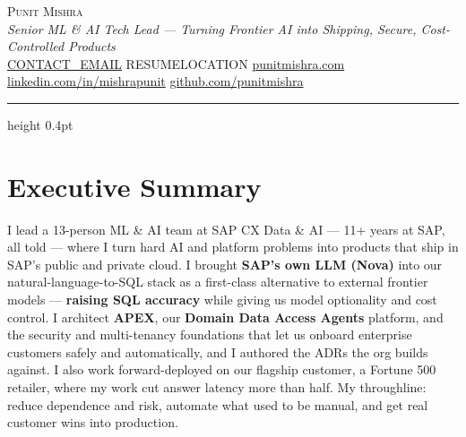 \documentclass[10pt,letterpaper]{article}
\begin{document}
\begin{center}
  {\huge\scshape Punit Mishra}\\[4pt]
  {\itshape Senior ML \& AI Tech Lead --- Turning Frontier AI into Shipping, Secure, Cost-Controlled Products}\\[6pt]
  {\small
    \href{mailto:CONTACT_EMAIL}{CONTACT\_EMAIL} \;\textbar\;
    RESUMELOCATION \;\textbar\;
    \href{https://punitmishra.com}{punitmishra.com} \;\textbar\;
    \href{https://linkedin.com/in/mishrapunit}{linkedin.com/in/mishrapunit} \;\textbar\;
    \href{https://github.com/punitmishra}{github.com/punitmishra}
  }
\end{center}
\vspace{2pt}\hrule height 0.4pt\vspace{2pt}

\section{Executive Summary}
I lead a 13-person ML \& AI team at SAP CX Data \& AI --- 11+ years at SAP, all told --- where I turn
hard AI and platform problems into products that ship in SAP's public and private cloud. I brought
\textbf{SAP's own LLM (Nova)} into our natural-language-to-SQL stack as a first-class alternative to
external frontier models --- \textbf{raising SQL accuracy} while giving us model optionality and cost
control. I architect \textbf{APEX}, our \textbf{Domain Data Access Agents} platform, and the security
and multi-tenancy foundations that let us onboard enterprise customers safely and automatically, and I
authored the ADRs the org builds against. I also work forward-deployed on our flagship customer, a
Fortune 500 retailer, where my work cut answer latency more than half. My throughline: reduce dependence
and risk, automate what used to be manual, and get real customer wins into production.

\end{document}
